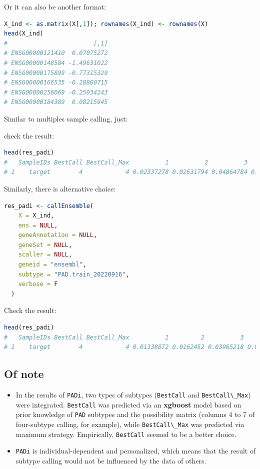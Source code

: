\documentclass[
  12pt,
]{book}
\newcommand{\passthrough}[1]{#1}
\begin{document}
Or it can also be another format:

\begin{lstlisting}[language=R]
X_ind <- as.matrix(X[,1]); rownames(X_ind) <- rownames(X)
head(X_ind)
#                        [,1]
# ENSG00000121410  0.07075272
# ENSG00000148584 -1.49631022
# ENSG00000175899 -0.77315329
# ENSG00000166535 -0.28860715
# ENSG00000256069 -0.25034243
# ENSG00000184389  0.08215945
\end{lstlisting}

Similar to multiples sample calling, just:

check the result:

\begin{lstlisting}[language=R]
head(res_padi)
#   SampleIDs BestCall BestCall_Max          1          2          3         4
# 1    target        4            4 0.02337278 0.02631794 0.04864784 0.3336484
\end{lstlisting}

Similarly, there is alternative choice:

\begin{lstlisting}[language=R]
res_padi <- callEnsemble(
    X = X_ind,
    ens = NULL,
    geneAnnotation = NULL,
    geneSet = NULL,
    scaller = NULL,
    geneid = "ensembl",
    subtype = "PAD.train_20220916",
    verbose = F
  )
\end{lstlisting}

Check the result:

\begin{lstlisting}[language=R]
head(res_padi)
#   SampleIDs BestCall BestCall_Max          1         2          3         4
# 1    target        4            4 0.01338872 0.0162452 0.03965218 0.8052567
\end{lstlisting}

\hypertarget{of-note-1}{%
\subsection{Of note}\label{of-note-1}}

\begin{itemize}
\item
  In the results of \passthrough{\lstinline!PADi!}, two types of subtypes (\passthrough{\lstinline!BestCall!} and \passthrough{\lstinline!BestCall\_Max!}) were integrated. \passthrough{\lstinline!BestCall!} was predicted via an \textbf{xgboost} model based on prior knowledge of \passthrough{\lstinline!PAD!} subtypes and the possibility matrix (columns 4 to 7 of four-subtype calling, for example), while \passthrough{\lstinline!BestCall\_Max!} was predicted via maximum strategy. Empirically, \passthrough{\lstinline!BestCall!} seemed to be a better choice.
\item
  \passthrough{\lstinline!PADi!} is individual-dependent and personalized, which means that the result of subtype calling would not be influenced by the data of others.
\end{itemize}
\end{document}
